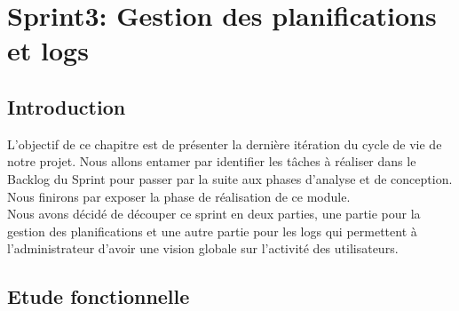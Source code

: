 
\chapter{Sprint3: Gestion des planifications et logs}
\section {Introduction}
L'objectif de ce chapitre est de présenter la dernière itération du cycle de vie de notre
projet. Nous allons entamer par identifier les tâches à réaliser dans le Backlog du Sprint pour
passer par la suite aux phases d'analyse et de conception. Nous finirons par exposer la phase de
réalisation de ce module. \\Nous avons décidé de découper ce sprint en deux parties, une
partie pour la gestion des planifications et une autre partie pour les logs qui permettent à l'administrateur d'avoir une vision globale sur l'activité des utilisateurs.
\section{Etude fonctionnelle}
